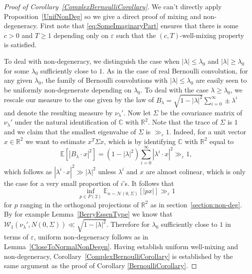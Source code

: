 \documentclass[10pt, english,oneside,reqno]{amsart}
\theoremstyle{plain}
\theoremstyle{remark}
\numberwithin{equation}{section}
\numberwithin{figure}{section}
\newcommand{\eps}{\varepsilon}
\newcommand{\R}{\mathbb{R}}
\newcommand{\C}{\mathbb{C}}
\newcommand{\E}{\mathbb{E}}
\begin{document}
\begin{proof}[Proof of Corollary~\ref{ComplexBernoulliCorollary}]
    We can't directly apply Proposition~\ref{UnifNonDeg} so we give a direct proof of mixing and non-degeneracy. First note that \eqref{eq:SomeImaginaryPart} ensures that there is some $c > 0$ and $T \geq 1$ depending only on $\varepsilon$ such that the $(c, T)$-well-mixing property is satisfied. 
    
    To deal with non-degeneracy, we distinguish the case when $|\lambda| \leq \lambda_0$ and $|\lambda| \geq \lambda_0$ for some $\lambda_0$ sufficiently close to $1$. As in the case of real Bernoulli convolution, for any given $\lambda_0$, the family of Bernoulli convolutions with $|\lambda| \leq \lambda_0$ are easily seen to be uniformly non-degenerate depending on $\lambda_0$. To deal with the case $\lambda \geq \lambda_0$, we rescale our measure to the one given by the law of $B_{\lambda} = \sqrt{1 - |\lambda|^2} \sum_{i=0}^{\infty} \pm \lambda^i$ and denote the resulting measure by $\nu_{\lambda}'$. Now let $\Sigma$ be the covariance matrix of $\nu_{\lambda}'$ under the natural identification of $\mathbb{C}$ with $\R^2$. Note that the trace of $\Sigma$ is $1$ and we claim that the smallest eigenvalue of $\Sigma$ is  $\gg_{\eps} 1$. Indeed, for a unit vector $x \in \R^2$ we want to estimate $x^T\Sigma x$, which is by identifying $\C$ with $\R^2$ equal to $$\E[|B_{\lambda}\cdot x|^2] = (1 - |\lambda|^2) \sum_{i = 0}^{\infty} |\lambda^i \cdot x|^2 \gg_{\eps} 1,$$ which follows as $|\lambda^i\cdot x|^2 \gg |\lambda|^2$ unless $\lambda^i$ and $x$ are almost colinear, which is only the case for a very small proportion of $i$'s. It follows that $$\inf_{p\in P(2)} \E_{x\sim \mathcal{N}(0,\Sigma)}[|px|]  \gg_{\eps} 1$$ for $p$ ranging in the orthogonal projections of $\R^2$ as in section~\ref{section:non-deg}. By for example Lemma~\ref{BerryEssenType} we know that $\mathcal{W}_1\left( \nu_{\lambda}', N(0, \Sigma) \right) \ll \sqrt{1 - |\lambda|^2}.$ Therefore for $\lambda_0$ sufficiently close to $1$ in terms of $\varepsilon$, uniform non-degeneracy follows as in Lemma~\ref{CloseToNormalNonDegen}. Having establish uniform well-mixing and non-degeneracy, Corollary~\ref{ComplexBernoulliCorollary} is established by the same argument as the proof of Corollary \ref{BernoulliCorollary}.
\end{proof}















\end{document}
